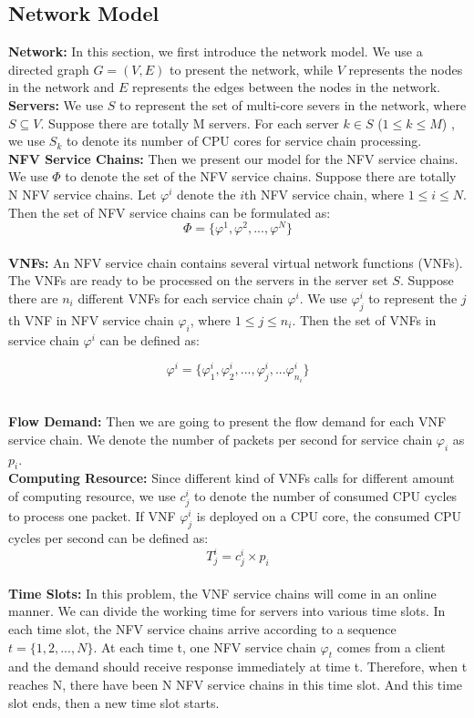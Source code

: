 \documentclass{acmtog}
\begin{document}
\subsection{Network Model}
\noindent \textbf{Network:} In this section, we first introduce the network model. We use a directed graph $G=(V,E)$ to present the network, while $V$ represents the nodes in the network and $E$ represents the edges between the nodes in the network.
\\ \textbf{Servers:} We use $S$ to represent the set of multi-core severs in the network, where $S \subseteq V$. Suppose there are totally M servers. For each server $k\in S$ ($1\leq k\leq M$) , we use $S_k$ to denote its number of CPU cores for service chain processing.
\\\textbf{NFV Service Chains: } Then we present our model for the NFV service chains.  We use $\Phi$ to denote the set of the NFV service chains. Suppose there are totally N NFV service chains. Let $\varphi^i$ denote the $i$th NFV service chain, where $1\leq i\leq N$. Then the set of NFV service chains can be formulated as:
$$\Phi = \{\varphi ^1,\varphi ^2,...,\varphi ^N\}$$
\vspace{-2ex}
\\\textbf{VNFs: } An NFV service chain contains several virtual network functions (VNFs). The VNFs are ready to be processed on the servers in the server set $S$. Suppose there are $n_i$ different VNFs for each service chain $\varphi^i$. We use $\varphi^i_j$ to represent the $j$th VNF in NFV service chain $\varphi_i$, where $1\leq j\leq n_i$. Then the set of VNFs in service chain $\varphi^i$ can be defined as:
\vspace{-2ex}
\begin{center}
\begin{equation}
\varphi ^i = \{\varphi ^i_1,\varphi ^i_2,...,\varphi ^i_j,...\varphi ^i_{n_i}\}
\end{equation}
\end{center}
\\\noindent\textbf{Flow Demand: } Then we are going to present the flow demand for each VNF service chain. We denote the number of packets per second for service chain $\varphi_i$ as $p_i$.
\\\noindent\textbf{Computing Resource: } Since different kind of VNFs calls for different amount of computing resource, we use $c^i_j$ to denote the number of consumed CPU cycles to process one packet. If VNF $\varphi^i_j$ is deployed on a CPU core, the consumed CPU cycles per second can be defined as:
\vspace{-1ex}
$$T^i_j=c^i_j\times p_i$$
\vspace{-2ex}
\\\noindent\textbf{Time Slots: } In this problem, the VNF service chains will come in an online manner. We can divide the working time for servers into various time slots. In each time slot, the NFV service chains arrive according to a sequence $t=\{1,2,...,N\}$. At each time t, one NFV service chain $\varphi_t$ comes from a client and the demand should receive response immediately at time t. Therefore, when t reaches N, there have been N NFV service chains in this time slot. And this time slot ends, then a new time slot starts.
\end{document}
